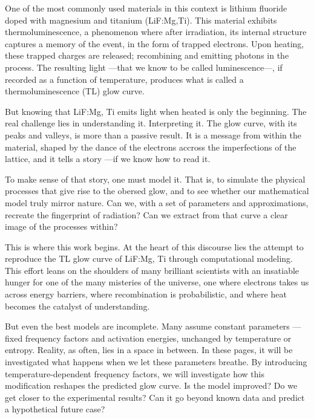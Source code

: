\vspace{10pt}

One of the most commonly used materials in this context is lithium fluoride doped with magnesium and titanium (LiF:Mg,Ti). This material exhibits thermoluminescence, a phenomenon where after irradiation, its internal structure captures a memory of the event, in the form of trapped electrons. Upon heating, these trapped charges are released; recombining and emitting photons in the process. The resulting light ---that we know to be called luminescence---, if recorded as a function of temperature, produces what is called a thermoluminescence (TL) glow curve. %

But knowing that LiF:Mg, Ti emits light when heated is only the beginning. The real challenge lies in understanding it. Interpreting it. The glow curve, with its peaks and valleys, is more than a passive result. It is a message from within the material, shaped by the dance of the electrons accross the imperfections of the lattice, and it tells a story ---if we know how to read it.

\vspace{10pt}

To make sense of that story, one must model it. That is, to simulate the physical processes that give rise to the obersed glow, and to see whether our mathematical model truly mirror nature. Can we, with a set of parameters and approximations, recreate the fingerprint of radiation? Can we extract from that curve a clear image of the processes within?

\vspace{10pt}

This is where this work begins. At the heart of this discourse lies the attempt to reproduce the TL glow curve of LiF:Mg, Ti through computational modeling. This effort leans on the shoulders of many brilliant scientists with an insatiable hunger for one of the many misteries of the universe, one where electrons takes us across energy barriers, where recombination is probabilistic, and where heat becomes the catalyst of understanding.

\vspace{10pt}

But even the best models are incomplete. Many assume constant parameters ---fixed frequency factors and activation energies, unchanged by temperature or entropy. Reality, as often, lies in a space in between. In these pages, it will be investigated what happens when we let these parameters breathe. By introducing temperature-dependent frequency factors, we will investigate how this modification reshapes the predicted glow curve. Is the model improved? Do we get closer to the experimental results? Can it go beyond known data and predict a hypothetical future case?


